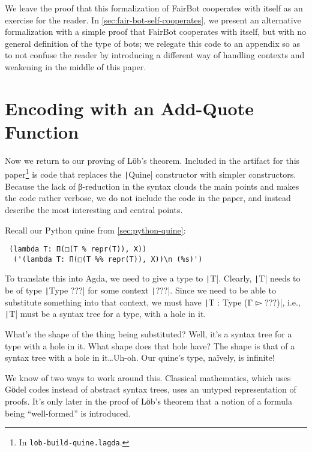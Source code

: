   We leave the proof that this formalization of FairBot cooperates
  with itself as an exercise for the reader. In
  \autoref{sec:fair-bot-self-cooperates}, we present an alternative
  formalization with a simple proof that FairBot cooperates with
  itself, but with no general definition of the type of bots; we
  relegate this code to an appendix so as to not confuse the reader by
  introducing a different way of handling contexts and weakening in
  the middle of this paper.

\section{Encoding with an Add-Quote Function} \label{sec:only-add-quote}

  Now we return to our proving of Lӧb's theorem.  Included in the
  artifact for this paper\footnote{In \texttt{lob-build-quine.lagda}.}
  is code that replaces the \texttt|Quine| constructor with
  simpler constructors.  Because the lack of β-reduction in the syntax
  clouds the main points and makes the code rather verbose, we do not
  include the code in the paper, and instead describe the most
  interesting and central points.

  Recall our Python quine from \autoref{sec:python-quine}:
\begin{verbatim}
 (lambda T: Π(□(T % repr(T)), X))
  ('(lambda T: Π(□(T %% repr(T)), X))\n (%s)')
\end{verbatim}

  To translate this into Agda, we need to give a type to
  \texttt|T|. Clearly, \texttt|T| needs to be of
  type \texttt|Type ???| for some context
  \texttt|???|.  Since we need to be able to substitute
  something into that context, we must have
  \texttt|T : Type (Γ ▻ ???)|, i.e., \texttt|T|
  must be a syntax tree for a type, with a hole in it.

  What's the shape of the thing being substituted?  Well, it's a
  syntax tree for a type with a hole in it.  What shape does that hole
  have?  The shape is that of a syntax tree with a hole in
  it\ldots\space Uh-oh.  Our quine's type, na\"ively, is infinite!

  We know of two ways to work around this.  Classical mathematics,
  which uses Gӧdel codes instead of abstract syntax trees, uses an
  untyped representation of proofs.  It's only later in the proof of
  Lӧb's theorem that a notion of a formula being ``well-formed'' is
  introduced.

